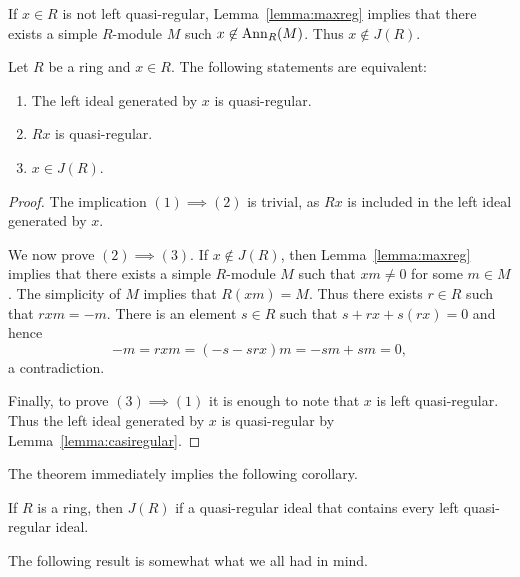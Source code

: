 If $x\in R$ is not left quasi-regular, Lemma~\ref{lemma:maxreg} implies that there exists 
a simple $R$-module $M$ such $x\not\in\operatorname{Ann}_R(M)$. Thus 
$x\not\in J(R)$.

\begin{theorem}
	\label{thm:casireg_eq}
	Let $R$ be a ring and $x\in R$. The following statements are equivalent: 
	\begin{enumerate}
		\item The left ideal generated by $x$ is quasi-regular.
		\item $Rx$ is quasi-regular.
		\item $x\in J(R)$.
	\end{enumerate}
\end{theorem}

\begin{proof}
	The implication $(1)\implies(2)$ is trivial, as $Rx$ is included in the left ideal 
	generated by $x$.  
	
	We now prove $(2)\implies(3)$. If
	$x\not\in J(R)$, then Lemma~\ref{lemma:maxreg} implies that there exists a simple 
	$R$-module $M$ such that $xm\ne 0$ for some $m\in M$. The simplicity of $M$ implies
	that $R(xm)=M$. Thus there exists $r\in R$ such that $rxm=-m$. There is an element 
	$s\in R$ such that $s+rx+s(rx)=0$ and hence 
	\[
	-m=rxm=(-s-srx)m=-sm+sm=0,
	\]
	a contradiction. 
	
	Finally, to prove $(3)\implies(1)$ it is enough to note that 
	$x$ is left quasi-regular. Thus the left ideal generated by 
	$x$ is quasi-regular by Lemma~\ref{lemma:casiregular}.
\end{proof}

The theorem immediately implies the following corollary. 

\begin{corollary}
	If $R$ is a ring, then $J(R)$ if a quasi-regular ideal that contains every 
	left quasi-regular ideal. 
\end{corollary}

The following result is somewhat what we all had in mind. 


